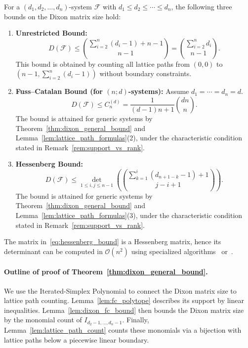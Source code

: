 \begin{corollary}\label{cor:three_bounds}
	For a $(d_1, d_2, \ldots, d_n)$-system $\mathcal{F}$ with $d_1 \leq d_2 \leq \cdots \leq d_n$, the following three bounds on the Dixon matrix size hold:
	\begin{enumerate}
		
		\item[(1)] \textbf{Unrestricted Bound:} 
		\begin{equation}\label{eq:unrestricted_bound}
			D(\mathcal{F}) \leq \binom{\sum_{i=2}^{n} (d_i - 1) + n - 1}{n - 1} = \binom{\sum_{i=2}^{n} d_i}{n - 1}.
		\end{equation}
		This bound is obtained by counting all lattice paths from $(0,0)$ to $(n-1, \sum_{i=2}^{n} (d_i - 1))$ without boundary constraints.
		
		\item[(2)] \textbf{Fuss--Catalan Bound (for $(n;d)$-systems):}
		Assume $d_1 = \cdots = d_n = d$.
		\begin{equation}\label{eq:fuss_catalan_bound}
			D(\mathcal{F}) \leq C_n^{(d)} = \frac{1}{(d-1)n+1}\binom{dn}{n}.
		\end{equation}
		The bound is attained for generic systems by Theorem~\ref{thm:dixon_general_bound} and Lemma~\ref{lem:lattice_path_formulas}(2), under the characteristic condition stated in Remark~\ref{rem:support_vs_rank}.
		
		\item[(3)] \textbf{Hessenberg Bound:} 
		\begin{equation}\label{eq:hessenberg_bound}
			D(\mathcal{F}) \leq \det_{1\leq i,j\leq n-1} \left( \binom{\sum_{k=1}^{i} (d_{n+1-k} - 1) + 1}{j - i + 1} \right).
		\end{equation}
		The bound is attained for generic systems by Theorem~\ref{thm:dixon_general_bound} and Lemma~\ref{lem:lattice_path_formulas}(3), under the characteristic condition stated in Remark~\ref{rem:support_vs_rank}.
		
		
	\end{enumerate}
\end{corollary}

\begin{remark}
	The matrix in~\eqref{eq:hessenberg_bound} is a Hessenberg matrix, hence its determinant can be computed in $\mathcal{O}(n^2)$ using specialized algorithms~\cite{cahill2002fibonacci} or~\cite[Theorem 1.9]{meurant2025hessenberg}.
\end{remark}

\paragraph{Outline of proof of Theorem~\ref{thm:dixon_general_bound}.}
We use the Iterated-Simplex Polynomial to connect the Dixon matrix size to lattice path counting. Lemma~\ref{lem:fc_polytope} describes its support by linear inequalities. Lemma~\ref{lem:dixon_fc_bound} then bounds the Dixon matrix size by the monomial count of $I_{d_2-1,\ldots,d_n-1}$. Finally, Lemma~\ref{lem:lattice_path_count} counts these monomials via a bijection with lattice paths below a piecewise linear boundary.

